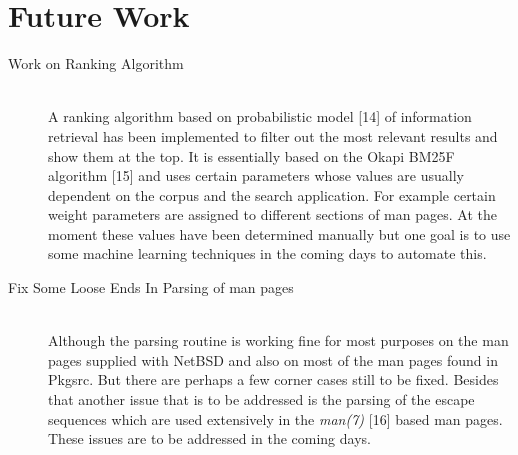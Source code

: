\documentclass[titlepage, a4paper, 12pt]{article}
\begin{document}
\section{Future Work}
\begin{description}
\item[Work on Ranking Algorithm] \hfill \\
A ranking algorithm based on probabilistic model [14] of information
retrieval has been implemented to filter out the most relevant results and show
them at the top. It is essentially based on the Okapi BM25F algorithm [15] and
uses certain parameters whose values are usually dependent on the corpus and the
search application. For example certain weight parameters are assigned to different sections of man pages. At the moment these values have been determined
manually but one goal is to use some machine learning techniques in the coming
days to automate this.
\end{description}
\begin{description}
\item[Fix Some Loose Ends In Parsing of man pages] \hfill \\
Although the parsing routine is working fine for most purposes on the man pages
supplied with NetBSD and also on most of the man pages found in Pkgsrc. But there
are perhaps a few corner cases still to be fixed. Besides that another issue that
is to be addressed is the parsing of the escape sequences which are used
extensively in the \textit{man(7)} [16] based man pages. These issues are to be
addressed in the coming days.
\end{description}
\end{document}
